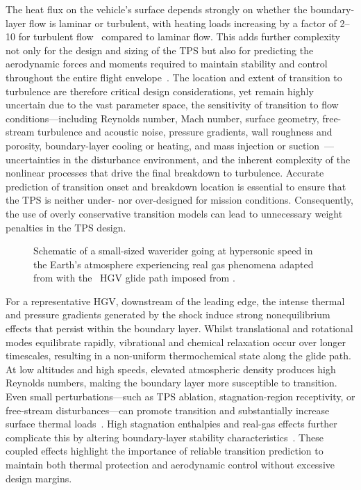 The heat flux on the vehicle's surface depends strongly on whether the boundary-layer flow is laminar or turbulent, with heating loads increasing by a factor of 2--10 for turbulent flow~\citep{White2005,VanDriest1952} compared to laminar flow. This adds further complexity not only for the design and sizing of the \gls{TPS} but also for predicting the aerodynamic forces and moments required to maintain stability and control throughout the entire flight envelope~\citep{Dalle2011}. The location and extent of transition to turbulence are therefore critical design considerations, yet remain highly uncertain due to the vast parameter space, the sensitivity of transition to flow conditions---including Reynolds number, Mach number, surface geometry, free-stream turbulence and acoustic noise, pressure gradients, wall roughness and porosity, boundary-layer cooling or heating, and mass injection or suction~\citep{Cebeci2001}---uncertainties in the disturbance environment, and the inherent complexity of the nonlinear processes that drive the final breakdown to turbulence. Accurate prediction of transition onset and breakdown location is essential to ensure that the \gls{TPS} is neither under- nor over-designed for mission conditions. Consequently, the use of overly conservative transition models can lead to unnecessary weight penalties in the \gls{TPS} design.

\begin{figure}[hbt!]
    \centering
    \fontsize{9}{10}\selectfont
    \caption[Schematic of a small-sized waverider going at hypersonic speed in the Earth’s atmosphere experiencing real gas phenomena adapted from \citep{Anderson2019} with the HGV glide path imposed from \citep{Rizvi2015}.]{Schematic of a small-sized waverider going at hypersonic speed in the Earth’s atmosphere experiencing real gas phenomena adapted from \citep{Anderson2019} with the ~\gls{HGV} glide path imposed from \citep{Rizvi2015}.}
    \label{figure:trajectory}
\end{figure}

For a representative \gls{HGV}, downstream of the leading edge, the intense thermal and pressure gradients generated by the shock induce strong nonequilibrium effects that persist within the boundary layer. Whilst translational and rotational modes equilibrate rapidly, vibrational and chemical relaxation occur over longer timescales, resulting in a non-uniform thermochemical state along the glide path. At low altitudes and high speeds, elevated atmospheric density produces high Reynolds numbers, making the boundary layer more susceptible to transition. Even small perturbations---such as \gls{TPS} ablation, stagnation-region receptivity, or free-stream disturbances---can promote transition and substantially increase surface thermal loads~\citep{MiroMiro2019}. High stagnation enthalpies and real-gas effects further complicate this by altering boundary-layer stability characteristics~\citep{Anderson2019}. These coupled effects highlight the importance of reliable transition prediction to maintain both thermal protection and aerodynamic control without excessive design margins.


